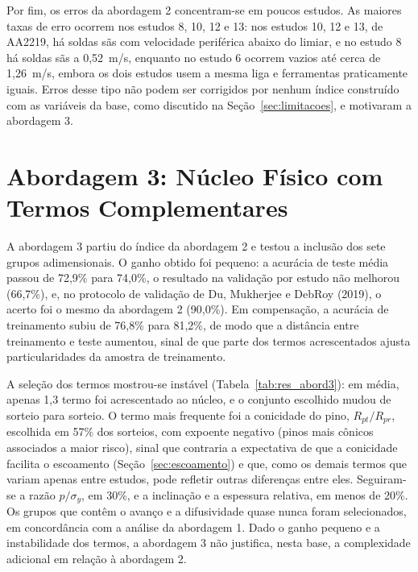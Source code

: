\documentclass[12pt,openany]{report}
\begin{document}
Por fim, os erros da abordagem 2 concentram-se em poucos estudos. As maiores taxas de erro ocorrem nos estudos 8, 10, 12 e 13: nos estudos 10, 12 e 13, de AA2219, há soldas sãs com velocidade periférica abaixo do limiar, e no estudo 8 há soldas sãs a 0,52~m/s, enquanto no estudo 6 ocorrem vazios até cerca de 1,26~m/s, embora os dois estudos usem a mesma liga e ferramentas praticamente iguais. Erros desse tipo não podem ser corrigidos por nenhum índice construído com as variáveis da base, como discutido na Seção~\ref{sec:limitacoes}, e motivaram a abordagem 3.

\section{Abordagem 3: Núcleo Físico com Termos Complementares}
\label{sec:res_abordagem3}

A abordagem 3 partiu do índice da abordagem 2 e testou a inclusão dos sete grupos adimensionais. O ganho obtido foi pequeno: a acurácia de teste média passou de 72,9\% para 74,0\%, o resultado na validação por estudo não melhorou (66,7\%), e, no protocolo de validação de Du, Mukherjee e DebRoy (2019), o acerto foi o mesmo da abordagem 2 (90,0\%). Em compensação, a acurácia de treinamento subiu de 76,8\% para 81,2\%, de modo que a distância entre treinamento e teste aumentou, sinal de que parte dos termos acrescentados ajusta particularidades da amostra de treinamento.

A seleção dos termos mostrou-se instável (Tabela~\ref{tab:res_abord3}): em média, apenas 1,3 termo foi acrescentado ao núcleo, e o conjunto escolhido mudou de sorteio para sorteio. O termo mais frequente foi a conicidade do pino, $R_{pt}/R_{pr}$, escolhida em 57\% dos sorteios, com expoente negativo (pinos mais cônicos associados a maior risco), sinal que contraria a expectativa de que a conicidade facilita o escoamento (Seção~\ref{sec:escoamento}) e que, como os demais termos que variam apenas entre estudos, pode refletir outras diferenças entre eles. Seguiram-se a razão $p/\sigma_y$, em 30\%, e a inclinação e a espessura relativa, em menos de 20\%. Os grupos que contêm o avanço e a difusividade quase nunca foram selecionados, em concordância com a análise da abordagem 1. Dado o ganho pequeno e a instabilidade dos termos, a abordagem 3 não justifica, nesta base, a complexidade adicional em relação à abordagem 2.
\end{document}
